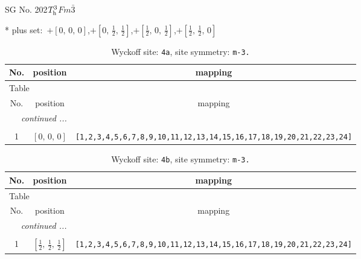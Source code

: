 \documentclass[fleqn,8pt]{jsarticle}
\begin{document}
\setcounter{MaxMatrixCols}{32}

\renewcommand{\tablename}{Table~}
\renewcommand{\figurename}{Figure~}
\begin{center}
\LARGE
SG No. 202\quad$T_{\rm h}^{3}$\quad$Fm\bar{3}$\quad[ cubic ]
\end{center}
* plus set:\,\,\,$+\left[ 0,\, 0,\, 0 \right]$,\quad $+\left[ 0,\, \frac{1}{2},\, \frac{1}{2} \right]$,\quad $+\left[ \frac{1}{2},\, 0,\, \frac{1}{2} \right]$,\quad $+\left[ \frac{1}{2},\, \frac{1}{2},\, 0 \right]$
\renewcommand{\arraystretch}{1.2}
\begin{longtable}{ccc}
\caption{Wyckoff site: {\tt 4a}, site symmetry: {\tt m-3.}}
 \\
 \hline \hline
No. & position & mapping \\ \hline \endfirsthead

\multicolumn{2}{l}{\tablename\ \thetable{}} \\
 \hline \hline
No. & position & mapping \\ \hline \endhead

 \hline \hline
\multicolumn{2}{r}{\footnotesize\it continued ...} \\ \endfoot

 \hline \hline
\multicolumn{2}{r}{} \\ \endlastfoot

1 & $\left[ 0,\, 0,\, 0 \right]$ & {\tt [1,2,3,4,5,6,7,8,9,10,11,12,13,14,15,16,17,18,19,20,21,22,23,24]} \\
\end{longtable}
\renewcommand{\arraystretch}{1.2}
\begin{longtable}{ccc}
\caption{Wyckoff site: {\tt 4b}, site symmetry: {\tt m-3.}}
 \\
 \hline \hline
No. & position & mapping \\ \hline \endfirsthead

\multicolumn{2}{l}{\tablename\ \thetable{}} \\
 \hline \hline
No. & position & mapping \\ \hline \endhead

 \hline \hline
\multicolumn{2}{r}{\footnotesize\it continued ...} \\ \endfoot

 \hline \hline
\multicolumn{2}{r}{} \\ \endlastfoot

1 & $\left[ \frac{1}{2},\, \frac{1}{2},\, \frac{1}{2} \right]$ & {\tt [1,2,3,4,5,6,7,8,9,10,11,12,13,14,15,16,17,18,19,20,21,22,23,24]} \\
\end{longtable}
\end{document}
